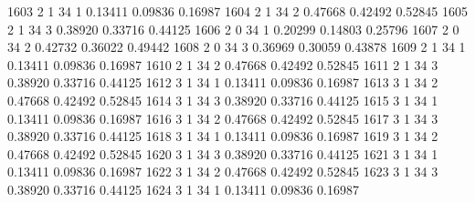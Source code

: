 \documentclass{article}
\begin{document}
\begin{Woutput}
1603      2       1      34       1       0.13411    0.09836    0.16987
1604      2       1      34       2       0.47668    0.42492    0.52845
1605      2       1      34       3       0.38920    0.33716    0.44125
1606      2       0      34       1       0.20299    0.14803    0.25796
1607      2       0      34       2       0.42732    0.36022    0.49442
1608      2       0      34       3       0.36969    0.30059    0.43878
1609      2       1      34       1       0.13411    0.09836    0.16987
1610      2       1      34       2       0.47668    0.42492    0.52845
1611      2       1      34       3       0.38920    0.33716    0.44125
1612      3       1      34       1       0.13411    0.09836    0.16987
1613      3       1      34       2       0.47668    0.42492    0.52845
1614      3       1      34       3       0.38920    0.33716    0.44125
1615      3       1      34       1       0.13411    0.09836    0.16987
1616      3       1      34       2       0.47668    0.42492    0.52845
1617      3       1      34       3       0.38920    0.33716    0.44125
1618      3       1      34       1       0.13411    0.09836    0.16987
1619      3       1      34       2       0.47668    0.42492    0.52845
1620      3       1      34       3       0.38920    0.33716    0.44125
1621      3       1      34       1       0.13411    0.09836    0.16987
1622      3       1      34       2       0.47668    0.42492    0.52845
1623      3       1      34       3       0.38920    0.33716    0.44125
1624      3       1      34       1       0.13411    0.09836    0.16987


\end{Woutput}
\end{document}
